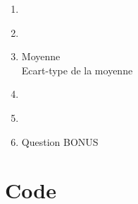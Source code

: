 \documentclass{article}
\begin{document}
\begin{enumerate}
    \item 
        \begin{figure}[h!] %
            \centering
        \end{figure}
    
    
    \item %
        \begin{lstlisting}[numbers=none] 
        \end{lstlisting}
    
    
    \item 
        \begin{figure}[h!] %
            \centering
        \end{figure}
    
    \begin{description}
        \item[Moyenne] 
        \item[Ecart-type de la moyenne]
    \end{description}
    
    
    \item 
         \begin{figure}[h!] %
             \centering
         \end{figure}
        
    
    \item %
    
    
    \item Question BONUS
\end{enumerate}

\newpage
\appendix

\section{Code}
%
\end{document}
